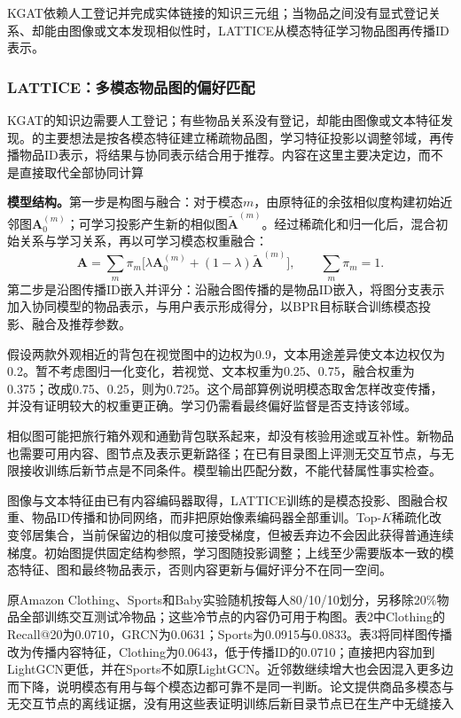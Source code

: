 KGAT依赖人工登记并完成实体链接的知识三元组；当物品之间没有显式登记关系、却能由图像或文本发现相似性时，LATTICE从模态特征学习物品图再传播ID表示。

\subsubsection{LATTICE：多模态物品图的偏好匹配}
\label{sec:rs-lattice}

KGAT的知识边需要人工登记；有些物品关系没有登记，却能由图像或文本特征发现。的主要想法是按各模态特征建立稀疏物品图，学习特征投影以调整邻域，再传播物品ID表示，将结果与协同表示结合用于推荐。内容在这里主要决定边，而不是直接取代全部协同计算

\textbf{模型结构。}第一步是构图与融合：对于模态$m$，由原特征的余弦相似度构建初始近邻图$\bm{A}^{(m)}_0$；可学习投影产生新的相似图$\widetilde{\bm{A}}^{(m)}$。经过稀疏化和归一化后，混合初始关系与学习关系，再以可学习模态权重融合：
\begin{equation}
  \bm{A}=\sum_m\pi_m
   \bigl[\lambda\bm{A}^{(m)}_0
          +(1-\lambda)\widetilde{\bm{A}}^{(m)}\bigr],
  \qquad \sum_m\pi_m=1.
  \label{eq:rs-lattice-graph}
\end{equation}
第二步是沿图传播ID嵌入并评分：沿融合图传播的是物品ID嵌入，将图分支表示加入协同模型的物品表示，与用户表示形成得分，以BPR目标联合训练模态投影、融合及推荐参数。

假设两款外观相近的背包在视觉图中的边权为0.9，文本用途差异使文本边权仅为0.2。暂不考虑图归一化变化，若视觉、文本权重为0.25、0.75，融合权重为0.375；改成0.75、0.25，则为0.725。这个局部算例说明模态取舍怎样改变传播，并没有证明较大的权重更正确。学习仍需看最终偏好监督是否支持该邻域。

相似图可能把旅行箱外观和通勤背包联系起来，却没有核验用途或互补性。新物品也需要可用内容、图节点及表示更新路径；在已有目录图上评测无交互节点，与无限接收训练后新节点是不同条件。模型输出匹配分数，不能代替属性事实检查。

图像与文本特征由已有内容编码器取得，LATTICE训练的是模态投影、图融合权重、物品ID传播和协同网络，而非把原始像素编码器全部重训。Top-$K$稀疏化改变邻居集合，当前保留边的相似度可接受梯度，但被丢弃边不会因此获得普通连续梯度。初始图提供固定结构参照，学习图随投影调整；上线至少需要版本一致的模态特征、图和最终物品表示，否则内容更新与偏好评分不在同一空间。

原Amazon Clothing、Sports和Baby实验随机按每人80/10/10划分，另移除20\%物品全部训练交互测试冷物品；这些冷节点的内容仍可用于构图。表2中Clothing的Recall@20为0.0710，GRCN为0.0631；Sports为0.0915与0.0833。表3将同样图传播改为传播内容特征，Clothing为0.0643，低于传播ID的0.0710；直接把内容加到LightGCN更低，并在Sports不如原LightGCN。近邻数继续增大也会因混入更多边而下降，说明模态有用与每个模态边都可靠不是同一判断。论文提供商品多模态与无交互节点的离线证据，没有用这些表证明训练后新目录节点已在生产中无缝接入

